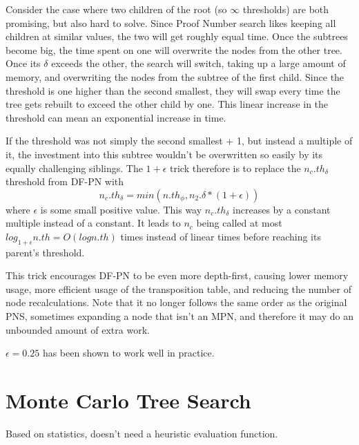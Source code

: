 Consider the case where two children of the root (so $\infty$ thresholds) are both promising, but also hard to solve. Since Proof Number search likes keeping all children at similar values, the two will get roughly equal time. Once the subtrees become big, the time spent on one will overwrite the nodes from the other tree. Once its $\delta$ exceeds the other, the search will switch, taking up a large amount of memory, and overwriting the nodes from the subtree of the first child. Since the threshold is one higher than the second smallest, they will swap every time the tree gets rebuilt to exceed the other child by one. This linear increase in the threshold can mean an exponential increase in time.

If the threshold was not simply the second smallest + 1, but instead a multiple of it, the investment into this subtree wouldn't be overwritten so easily by its equally challenging siblings. The $1 + \epsilon$ trick therefore is to replace the $n_c.th_\delta$ threshold from DF-PN with $$n_c.th_\delta = min(n.th_\phi, n_2.\delta*(1 + \epsilon))$$ where $\epsilon$ is some small positive value. This way $n_c.th_\delta$ increases by a constant multiple instead of a constant. It leads to $n_c$ being called at most $log_{1+\epsilon}n.th = O(log n.th)$ times instead of linear times before reaching its parent's threshold.

This trick encourages DF-PN to be even more depth-first, causing lower memory usage, more efficient usage of the transposition table, and reducing the number of node recalculations. Note that it no longer follows the same order as the original PNS, sometimes expanding a node that isn't an MPN, and therefore it may do an unbounded amount of extra work.

$\epsilon = 0.25$ has been shown to work well in practice.


\section{Monte Carlo Tree Search}

Based on statistics, doesn't need a heuristic evaluation function.

